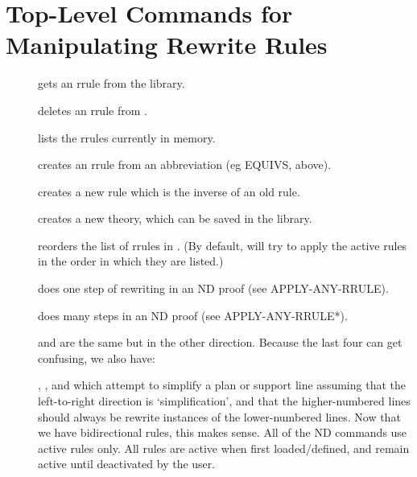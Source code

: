 \section{Top-Level Commands for Manipulating Rewrite Rules}
\begin{description}
\item[]  gets an rrule from the library.

\item[]  deletes an rrule from {\TPS}.

\item[]  lists the rrules currently in memory.

\item[]  creates an rrule from an abbreviation (eg EQUIVS, above).

\item[]  creates a new rule which is the inverse of an old rule.

\item[]  creates a new theory, which can be saved in the library.

\item[]  reorders the list of rrules in {\TPS}. (By default, {\TPS} will try to apply the
active rules in the order in which they are listed.)

\item[]  does one step of rewriting in an ND proof (see APPLY-ANY-RRULE).

\item[]  does many steps in an ND proof (see APPLY-ANY-RRULE*).

\item[]  and  are the same but in the other direction.
 Because the last four can get confusing, we also have:

\item[] , ,  and 
 which attempt to simplify a plan or support line assuming that the left-to-right
  direction is `simplification', and that the higher-numbered lines should
  always be rewrite instances of the lower-numbered lines.
  Now that we have bidirectional rules, this makes sense.
  All of the ND commands use active rules only. All rules are active when
  first loaded/defined, and remain active until deactivated by the user.


\end{description}

